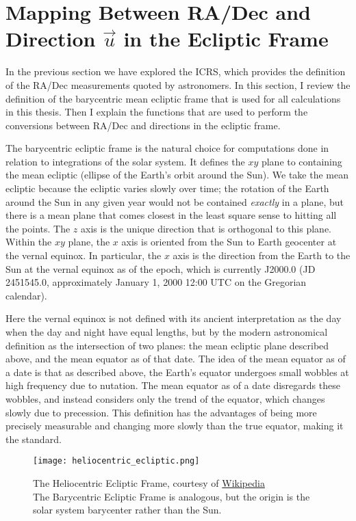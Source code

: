\section{Mapping Between RA/Dec and Direction $\vec{u}$ in the Ecliptic Frame}
\label{section_ra_dec_to_dir}
In the previous section we have explored the ICRS, which provides the definition of the RA/Dec measurements quoted by astronomers.
In this section, I review the definition of the barycentric mean ecliptic frame that is used for all calculations in this thesis.
Then I explain the functions that are used to perform the conversions between RA/Dec and directions in the ecliptic frame.

The barycentric ecliptic frame is the natural choice for computations done in relation to integrations of the solar system.
It defines the $xy$ plane to containing the mean ecliptic (ellipse of the Earth's orbit around the Sun).
We take the mean ecliptic because the ecliptic varies slowly over time; 
the rotation of the Earth around the Sun in any given year would not be contained \textit{exactly} in a plane,
but there is a mean plane that comes closest in the least square sense to hitting all the points.
The $z$ axis is the unique direction that is orthogonal to this plane.
Within the $xy$ plane, the $x$ axis is oriented from the Sun to Earth geocenter at the vernal equinox.
In particular, the $x$ axis is the direction from the Earth to the Sun at the vernal equinox as of the epoch, 
which is currently J2000.0 (JD 2451545.0, approximately January 1, 2000 12:00 UTC on the Gregorian calendar).

Here the vernal equinox is not defined with its ancient interpretation as the day when the day and night have equal lengths,
but by the modern astronomical definition as the intersection of two planes:
the mean ecliptic plane described above, and the mean equator as of that date.
The idea of the mean equator as of a date is that as described above, the Earth's equator undergoes small wobbles at high frequency due to nutation.
The mean equator as of a date disregards these wobbles, and instead considers only the trend of the equator, which changes slowly due to precession.
This definition has the advantages of being more precisely measurable and changing more slowly than the true equator, making it the standard.

\begin{figure}[hbt!]
\begin{center}
\texttt{[image: heliocentric\_ecliptic.png]}
\caption{The Heliocentric Ecliptic Frame, courtesy of \href{https://en.wikipedia.org/wiki/Ecliptic_coordinate_system}{Wikipedia}\\
The Barycentric Ecliptic Frame is analogous, but the origin is the solar system barycenter rather than the Sun.}
\end{center}
\end{figure}

